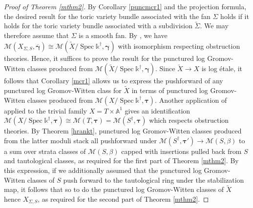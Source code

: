 \documentclass[12pt, oneside]{amsart}   	%
\newcounter{thm}
\newcommand{\kk}{\mathds{k}}
\newcommand{\Spec}{\operatorname{Spec}}
\numberwithin{equation}{section}
\numberwithin{thm}{section}
\numberwithin{figure}{section}
\begin{document}
\begin{proof}[Proof of Theorem \ref{mthm2}]
By Corollary \ref{puncmcr1} and the projection formula, the desired result for the toric variety bundle associated with the fan $\Sigma$ holds if it holds for the toric variety bundle associated with a subdivision $\widetilde{\Sigma}$. We may therefore assume that $\Sigma$ is a smooth fan. By \cite[Theorem $6.2$]{trglue}, we have $\mathscr{M}(X_{\Sigma,S},\overline{\pmb\gamma}) \cong \mathscr{M}(\widetilde{X}/\Spec\kk^{\dagger},\pmb\gamma)$ with isomorphism respecting obstruction theories. Hence, it suffices to prove the result for the punctured log Gromov-Witten classes produced from $\mathscr{M}(\widetilde{X}/\Spec\kk^{\dagger},\pmb\gamma)$. Since $\widetilde{X} \rightarrow X$ is log \'etale, it follows that Corollary \ref{mcr1} allows us to express the pushforward of any punctured log Gromov-Witten class for $\widetilde{X}$ in terms of punctured log Gromov-Witten classes produced from $\mathscr{M}(X/\Spec\kk^{\dagger},\pmb\tau)$. Another application of \cite[Theorem $6.2$]{trglue} applied to the trivial family $ X = T\times \mathbb{A}^1$ gives an identification $\mathscr{M}(X/\Spec\kk^{\dagger},\pmb\tau)\cong\mathscr{M}(T,\pmb\tau) = \mathscr{M}(S^{\dagger},\pmb\tau)$ which respects obstruction theories. By Theorem \ref{hrankt}, punctured log Gromov-Witten classes produced from the latter moduli stack all pushforward under $\mathscr{M}(S^{\dagger},\pmb\tau') \rightarrow \mathscr{M}(S,\beta)$ to a sum over strata classes of $\mathscr{M}(S,\beta)$ capped with insertions pulled back from $S$ and tautological classes, as required for the first part of Theorem \ref{mthm2}. By this expression, if we additionally assumed that the punctured log Gromov-Witten classes of $S$ push forward to the tautological ring under the stabilization map, it follows that so to do the punctured log Gromov-Witten classes of $\widetilde{X}$ hence $X_{\Sigma,S}$, as required for the second part of Theorem \ref{mthm2}.



\end{proof}
\end{document}
